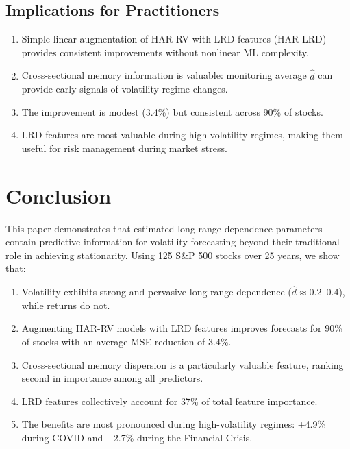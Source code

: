 \documentclass[12pt,a4paper]{article}
\begin{document}
\subsection{Implications for Practitioners}

\begin{enumerate}
    \item Simple linear augmentation of HAR-RV with LRD features (HAR-LRD) provides consistent improvements without nonlinear ML complexity.
    \item Cross-sectional memory information is valuable: monitoring average $\hat{d}$ can provide early signals of volatility regime changes.
    \item The improvement is modest (3.4\%) but consistent across 90\% of stocks.
    \item LRD features are most valuable during high-volatility regimes, making them useful for risk management during market stress.
\end{enumerate}

\section{Conclusion}
\label{sec:conclusion}

This paper demonstrates that estimated long-range dependence parameters contain predictive information for volatility forecasting beyond their traditional role in achieving stationarity. Using 125 S\&P 500 stocks over 25 years, we show that:

\begin{enumerate}
    \item Volatility exhibits strong and pervasive long-range dependence ($\hat{d} \approx 0.2$--$0.4$), while returns do not.
    \item Augmenting HAR-RV models with LRD features improves forecasts for 90\% of stocks with an average MSE reduction of 3.4\%.
    \item Cross-sectional memory dispersion is a particularly valuable feature, ranking second in importance among all predictors.
    \item LRD features collectively account for 37\% of total feature importance.
    \item The benefits are most pronounced during high-volatility regimes: +4.9\% during COVID and +2.7\% during the Financial Crisis.
\end{enumerate}
\end{document}
